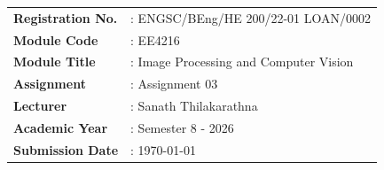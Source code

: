 \begin{titlepage}
\begin{center}
\begin{tabular}{ll}
\textbf{Registration No.}  &: ENGSC/BEng/HE 200/22-01 LOAN/0002 \\

\textbf{Module Code}       &: EE4216 \\

\textbf{Module Title}      &: Image Processing and Computer Vision \\

\textbf{Assignment}        &: Assignment 03 \\

\textbf{Lecturer}          &: Sanath Thilakarathna \\

\textbf{Academic Year}     &: Semester 8 - 2026 \\

\textbf{Submission Date}   &: \today \\

\end{tabular}

\vfill


\end{center}

\end{titlepage}